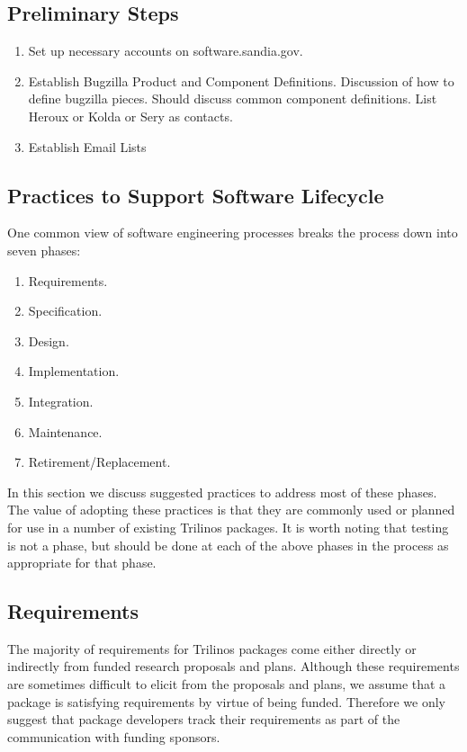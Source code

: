 \documentclass[12pt,relax]{SANDreport}
\begin{document}
\subsection{Preliminary Steps}

\begin{enumerate}
\item Set up necessary accounts on software.sandia.gov.
\item Establish Bugzilla Product and Component Definitions.
Discussion of how to define bugzilla pieces.  Should discuss common component 
definitions.  List Heroux or Kolda or Sery as contacts.
\item Establish Email Lists
\end{enumerate}

\subsection{Practices to Support Software Lifecycle}

One common view of software engineering processes breaks the process down into 
seven phases:
\begin{enumerate}
\item Requirements.
\item Specification.
\item Design.
\item Implementation.
\item Integration.
\item Maintenance.
\item Retirement/Replacement.
\end{enumerate}
In this section we discuss suggested practices to address most of these 
phases.  The value of adopting these practices is that they are commonly used 
or planned for use in a number of existing Trilinos packages.  It is worth 
noting that testing is not a phase, but should be done at each of the above 
phases in the process as appropriate for that phase.

\subsection{Requirements}
The majority of requirements for Trilinos packages come either directly or 
indirectly from funded research proposals and plans.  Although these 
requirements are sometimes difficult to elicit from the proposals and plans, 
we assume that a package is satisfying requirements by virtue of being 
funded.  Therefore we only suggest that package developers track their 
requirements as part of the communication with funding sponsors.
\end{document}
